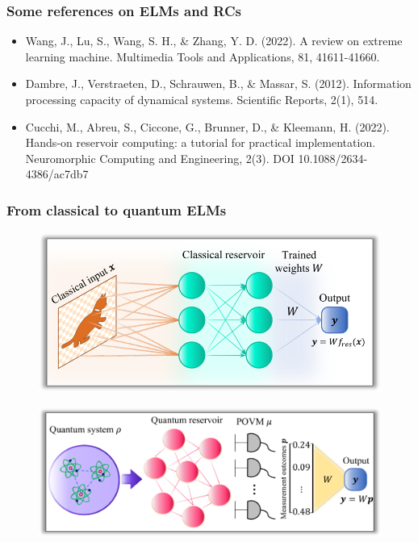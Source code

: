 \documentclass{beamer}
\begin{document}
\begin{frame}
\end{frame}




\begin{frame}
  \frametitle{Some references on ELMs and RCs}
  \begin{itemize}\small
      \item Wang, J., Lu, S., Wang, S. H., \& Zhang, Y. D. (2022). A review on extreme learning machine. Multimedia Tools and Applications, 81, 41611-41660.
      \item Dambre, J., Verstraeten, D., Schrauwen, B., \& Massar, S. (2012). Information processing capacity of dynamical systems. Scientific Reports, 2(1), 514.
      \item Cucchi, M., Abreu, S., Ciccone, G., Brunner, D., \& Kleemann, H. (2022). Hands-on reservoir computing: a tutorial for practical implementation. Neuromorphic Computing and Engineering, 2(3). DOI 10.1088/2634-4386/ac7db7
  \end{itemize}
\end{frame}

%
\begin{frame}

\frametitle{From classical to quantum ELMs}
\begin{figure}
\includegraphics[width=0.7\linewidth]{figures/scheme_ELM.png}
\end{figure}
\begin{figure}
\includegraphics[width=0.7\linewidth]{figures/scheme_QELM.png}
\end{figure}
\end{frame}
%
\end{document}
